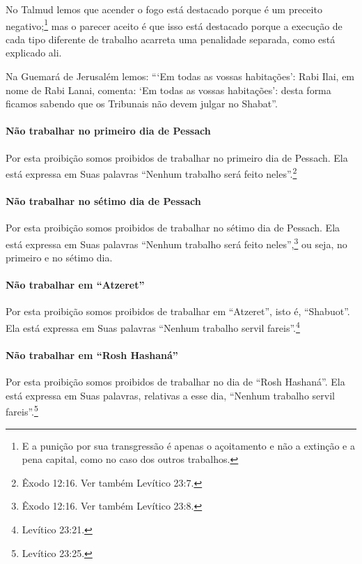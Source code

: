 No Talmud lemos que acender o fogo está destacado porque é um preceito
negativo;\footnote{E a punição por sua transgressão é apenas o açoitamento e não a
  extinção e a pena capital, como no caso dos outros trabalhos.} mas o parecer aceito é que isso está
destacado porque a execução de cada tipo diferente de trabalho acarreta
uma penalidade separada, como está explicado ali.

Na Guemará de Jerusalém lemos: ```Em todas as vossas habitações': Rabi
Ilai, em nome de Rabi Lanai, comenta: `Em todas as vossas habitações':
desta forma ficamos sabendo que os Tribunais não devem julgar no
Shabat''.

\paragraph{Não trabalhar no primeiro dia de Pessach}

Por esta proibição somos proibidos de trabalhar no primeiro dia de
Pessach. Ela está expressa em Suas palavras ``Nenhum trabalho será
feito neles''.\footnote{Êxodo 12:16. Ver também Levítico 23:7.}

\paragraph{Não trabalhar no sétimo dia de Pessach}

Por esta proibição somos proibidos de trabalhar no sétimo dia de
Pessach. Ela está expressa em Suas palavras ``Nenhum trabalho será
feito neles'',\footnote{Êxodo 12:16. Ver também Levítico 23:8.} ou seja, no primeiro e no sétimo dia.

\paragraph{Não trabalhar em ``Atzeret''}

Por esta proibição somos proibidos de trabalhar em ``Atzeret'', isto é,
``Shabuot''. Ela está expressa em Suas palavras ``Nenhum trabalho servil
fareis''.\footnote{Levítico 23:21.}

\paragraph{Não trabalhar em ``Rosh Hashaná''}

Por esta proibição somos proibidos de trabalhar no dia de ``Rosh
Hashaná''. Ela está expressa em Suas palavras, relativas a esse dia,
``Nenhum trabalho servil fareis''.\footnote{Levítico 23:25.}

